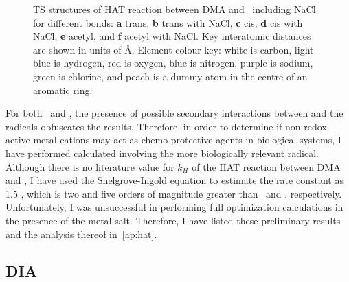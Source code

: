 \begin{figure}[!htbp]\ContinuedFloat
  \setcounter{subfigure}{4}

  \caption[TS structures of HAT reaction between DMA and \bno\ including
  NaCl.]{TS structures of HAT reaction between DMA and \bno\ including NaCl for
  different  bonds: \textbf{a} trans, \textbf{b} trans with NaCl,
  \textbf{c} cis, \textbf{d} cis with NaCl, \textbf{e} acetyl, and \textbf{f}
  acetyl with NaCl. Key interatomic distances are shown in units of \AA.
  Element colour key: white is carbon, light blue is hydrogen, red is oxygen,
  blue is nitrogen, purple is sodium, green is chlorine, and peach is a dummy
  atom in the centre of an aromatic ring.} \label{fig:dma-bno-ts}
\end{figure}

For both \cumo\ and \bno, the presence of possible secondary interactions
between  and the radicals obfuscates the results. Therefore, in order
to determine if non-redox active metal cations may act as chemo-protective
agents in biological systems, I have performed calculated involving the more
biologically relevant  radical. Although there is no literature value
for $k_H$ of the HAT reaction between DMA and , I have used the
Snelgrove-Ingold equation\cite{Snelgrove2001} to estimate the rate constant as
1.5 \Ms, which is two and five orders of magnitude greater than \bno\ and
\cumo, respectively. Unfortunately, I was unsuccessful in performing full
optimization calculations in the presence of the metal salt. Therefore, I have
listed these preliminary results and the analysis thereof in~\ref{ap:hat}.


\subsection{DIA}

